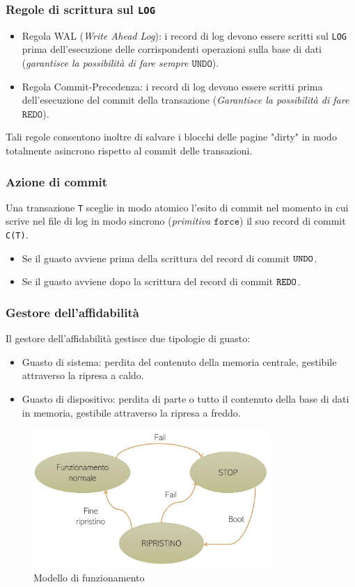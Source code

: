 \documentclass[oneside,a4paper,11pt]{book}
\theoremstyle{italicstyle}
\theoremstyle{normStyle}
\begin{document}
\subsubsection{Regole di scrittura sul \texttt{LOG}}
\begin{itemize}
    \item Regola WAL (\textit{Write Ahead Log}): i record di log devono 
    essere scritti sul \verb|LOG| prima dell'esecuzione delle corrispondenti operazioni sulla base di dati 
    (\textit{garantisce la possibilità di fare sempre $\texttt{UNDO}$}).
    \item Regola Commit-Precedenza: i record di log devono essere 
    scritti prima dell'esecuzione del commit della transazione (\textit{Garantisce 
    la possibilità di fare $\texttt{REDO}$}).
\end{itemize}
Tali regole consentono inoltre di salvare i blocchi delle pagine "dirty" in 
modo totalmente asincrono rispetto al commit delle transazioni.
\subsubsection{Azione di commit}
Una transazione \verb|T| sceglie in modo atomico l'esito di commit nel momento in cui 
scrive nel file di log in modo sincrono (\textit{primitiva $\texttt{force}$}) il suo record di commit \verb|C(T)|.
\begin{itemize}
    \item Se il guasto avviene prima della scrittura del record di commit $\verb|UNDO|$.
    \item Se il guasto avviene dopo la scrittura del record di commit $\verb|REDO|$.
\end{itemize}
\subsubsection{Gestore dell'affidabilità}
Il gestore dell'affidabilità gestisce due tipologie di guasto:
\begin{itemize}
    \item Guasto di sistema: perdita del contenuto della memoria centrale, gestibile attraverso
    la ripresa a caldo.
    \item Guasto di dispositivo: perdita di parte o tutto il contenuto 
    della base di dati in memoria, gestibile attraverso la ripresa a freddo.
\end{itemize}
\begin{figure}[H]
    \centering
    \includegraphics[width=9cm]{img/modelloAffidabilita.jpeg}
    \caption{Modello di funzionamento}
    \label{fig:Modelloaffidabilita}
\end{figure}
\end{document}
